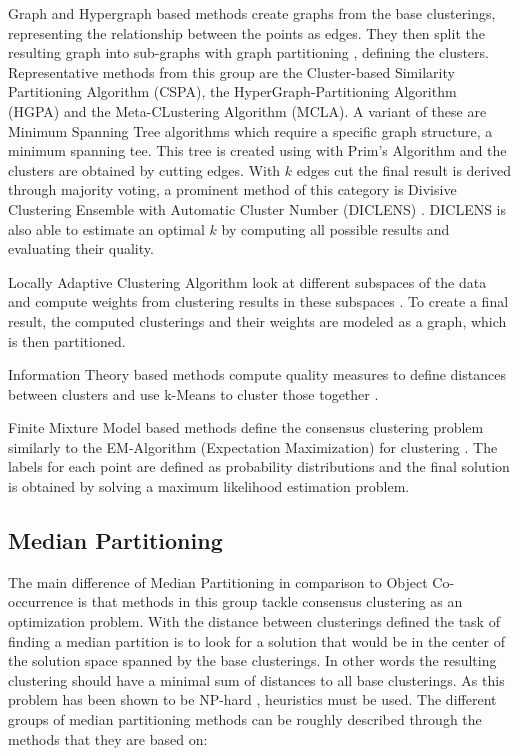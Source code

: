 \documentclass[
	a4paper,
	english,
	twoside,
	openright,               
	11pt                            
	]{report}
\begin{document}
Graph and Hypergraph based methods create graphs from the base clusterings, representing the relationship between the points as edges. They then split the resulting graph into sub-graphs with graph partitioning \cite{Strehl:2003:CEK:944919.944935}, defining the clusters. Representative methods from this group are the Cluster-based Similarity Partitioning Algorithm (CSPA), the HyperGraph-Partitioning Algorithm (HGPA) and the Meta-CLustering Algorithm (MCLA). A variant of these are Minimum Spanning Tree algorithms which require a specific graph structure, a minimum spanning tee. This tree is created using with Prim's Algorithm \cite[p.~276]{10.1007/978-3-540-85033-5_27} and the clusters are obtained by cutting edges. With $k$ edges cut the final result is derived through majority voting, a prominent method of this category is Divisive Clustering Ensemble with Automatic Cluster Number (DICLENS) \cite{6035671}. DICLENS is also able to estimate an optimal $k$ by computing all possible results and evaluating their quality.

Locally Adaptive Clustering Algorithm look at different subspaces of the data and compute weights from clustering results in these subspaces \cite{Domeniconi2007}. To create a final result, the computed clusterings and their weights are modeled as a graph, which is then partitioned.

Information Theory based methods compute quality measures to define distances between clusters and use k-Means to cluster those together \cite[p.~353]{survey1}.

Finite Mixture Model based methods define the consensus clustering problem similarly to the EM-Algorithm (Expectation Maximization) for clustering \cite{Goder2008ConsensusCA,Topchy2004AMM}. The labels for each point are defined as  probability distributions and the final solution is obtained by solving a maximum likelihood estimation problem.

\subsection{Median Partitioning}
The main difference of Median Partitioning in comparison to Object Co-occurrence is that methods in this group tackle consensus clustering as an optimization problem. With the distance between clusterings defined the task of finding a median partition is to look for a solution that would be in the center of the solution space spanned by the base clusterings. In other words the resulting clustering should have a minimal sum of distances to all base clusterings. As this problem has been shown to be NP-hard \cite{np_median_partition}, heuristics must be used. The different groups of median partitioning methods can be roughly described through the methods that they are based on:
\end{document}
